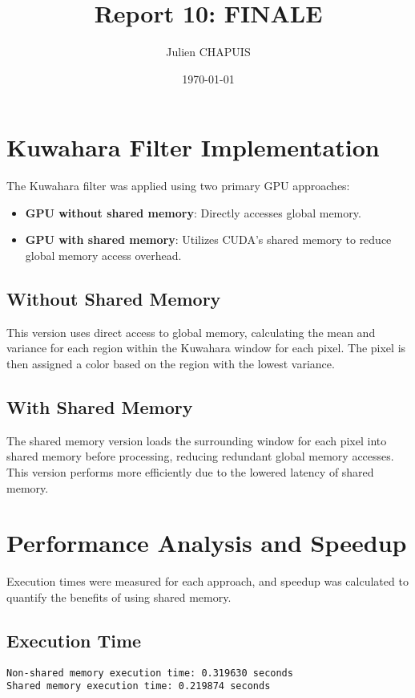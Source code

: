\documentclass{article}
\title{Report 10: FINALE}
\author{Julien CHAPUIS}
\date{\today}
\begin{document}
\maketitle

\section{Kuwahara Filter Implementation}

The Kuwahara filter was applied using two primary GPU approaches:
\begin{itemize}
    \item \textbf{GPU without shared memory}: Directly accesses global memory.
    \item \textbf{GPU with shared memory}: Utilizes CUDA’s shared memory to reduce global memory access overhead.
\end{itemize}

\subsection{Without Shared Memory}
This version uses direct access to global memory, calculating the mean and variance for each region within the Kuwahara window for each pixel. The pixel is then assigned a color based on the region with the lowest variance.

\subsection{With Shared Memory}
The shared memory version loads the surrounding window for each pixel into shared memory before processing, reducing redundant global memory accesses. This version performs more efficiently due to the lowered latency of shared memory.

\section{Performance Analysis and Speedup}

Execution times were measured for each approach, and speedup was calculated to quantify the benefits of using shared memory.

\subsection{Execution Time}
\begin{verbatim}
Non-shared memory execution time: 0.319630 seconds
Shared memory execution time: 0.219874 seconds
\end{verbatim}
\end{document}
